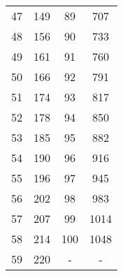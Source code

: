 \begin{table}[H]
\begin{tabular}{S S S S}
            47 & 149 & 89  & 707  \\
            48 & 156 & 90  & 733  \\
            49 & 161 & 91  & 760  \\
            50 & 166 & 92  & 791  \\
            51 & 174 & 93  & 817  \\
            52 & 178 & 94  & 850  \\
            53 & 185 & 95  & 882  \\
            54 & 190 & 96  & 916  \\
            55 & 196 & 97  & 945  \\
            56 & 202 & 98  & 983  \\
            57 & 207 & 99  & 1014 \\
            58 & 214 & 100 & 1048 \\
            59 & 220 & {-} & {-}  \\
      \bottomrule
    \end{tabular}
  \end{table}